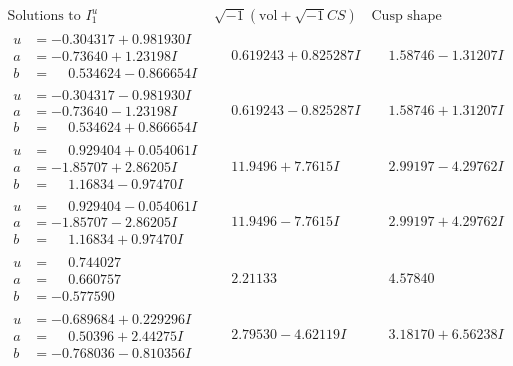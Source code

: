 \documentclass[1p]{elsarticle_modified}
\theoremstyle{definition}
\newcommand{\I}{\sqrt{-1}}
\begin{document}
$$\begin{array}{c|c|c}  
\text{Solutions to }I^u_{1}& \I (\text{vol} + \sqrt{-1}CS) & \text{Cusp shape}\\
 \hline 
\begin{aligned}
u &= -0.304317 + 0.981930 I \\
a &= -0.73640 + 1.23198 I \\
b &= \phantom{-}0.534624 - 0.866654 I\end{aligned}
 & \phantom{-}0.619243 + 0.825287 I & \phantom{-}1.58746 - 1.31207 I \\ \hline\begin{aligned}
u &= -0.304317 - 0.981930 I \\
a &= -0.73640 - 1.23198 I \\
b &= \phantom{-}0.534624 + 0.866654 I\end{aligned}
 & \phantom{-}0.619243 - 0.825287 I & \phantom{-}1.58746 + 1.31207 I \\ \hline\begin{aligned}
u &= \phantom{-}0.929404 + 0.054061 I \\
a &= -1.85707 + 2.86205 I \\
b &= \phantom{-}1.16834 - 0.97470 I\end{aligned}
 & \phantom{-}11.9496 + 7.7615 I & \phantom{-}2.99197 - 4.29762 I \\ \hline\begin{aligned}
u &= \phantom{-}0.929404 - 0.054061 I \\
a &= -1.85707 - 2.86205 I \\
b &= \phantom{-}1.16834 + 0.97470 I\end{aligned}
 & \phantom{-}11.9496 - 7.7615 I & \phantom{-}2.99197 + 4.29762 I \\ \hline\begin{aligned}
u &= \phantom{-}0.744027\phantom{ +0.000000I} \\
a &= \phantom{-}0.660757\phantom{ +0.000000I} \\
b &= -0.577590\phantom{ +0.000000I}\end{aligned}
 & \phantom{-}2.21133\phantom{ +0.000000I} & \phantom{-}4.57840\phantom{ +0.000000I} \\ \hline\begin{aligned}
u &= -0.689684 + 0.229296 I \\
a &= \phantom{-}0.50396 + 2.44275 I \\
b &= -0.768036 - 0.810356 I\end{aligned}
 & \phantom{-}2.79530 - 4.62119 I & \phantom{-}3.18170 + 6.56238 I \\ \hline\begin{aligned}

\end{aligned}
\end{array}$$
\end{document}
